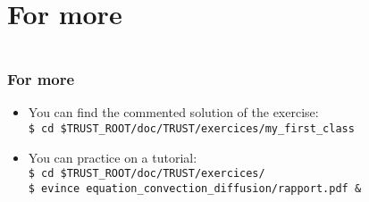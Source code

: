 \documentclass[10pt, hyperref={unicode=true,pdfusetitle, bookmarks=true,bookmarksnumbered=false,bookmarksopen=false, breaklinks=false,pdfborder={0 0 1},backref=true,colorlinks=true,linkcolor=darkblue,pageanchor, urlcolor=darkblue}]{beamer}
\begin{document}
\section{{\bf{For more}}}
\begin{frame}
\begin{columns}[c] 
\tableofcontents[sections={1-4},currentsection, currentsubsection]
\tableofcontents[sections={5-8},currentsection, currentsubsection]
\end{columns}
\end{frame}
\begin{frame}
\frametitle{For more}
\begin{block}{}

\begin{itemize}
\item You can find the commented solution of the exercise:\\
\texttt{\$ cd \$TRUST\_ROOT/doc/TRUST/exercices/my\_first\_class}

\item You can practice on a tutorial:\\
\texttt{\$ cd \$TRUST\_ROOT/doc/TRUST/exercices/}\\
\texttt{\$ evince equation\_convection\_diffusion/rapport.pdf \&}
\end{itemize}

\end{block}
\end{frame}













\end{document}
